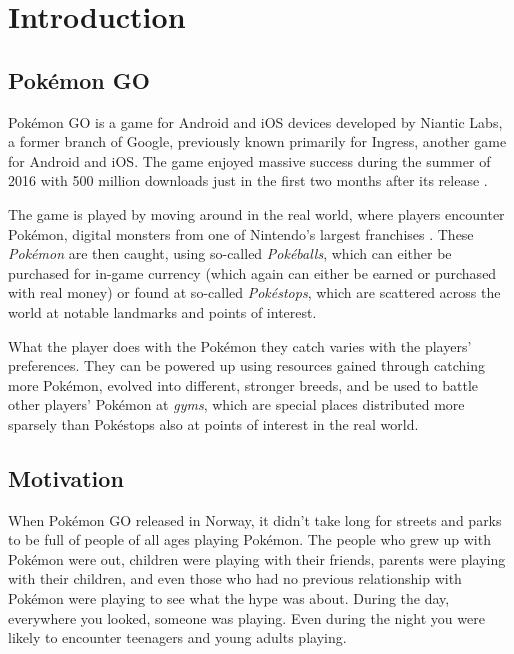
\chapter{Introduction}

\label{Chapter1}

\section{Pokémon GO}
\label{sec:about-pokemon-go}

Pokémon GO is a game for Android and iOS devices developed by Niantic Labs, a former branch of Google, previously known primarily for Ingress, another game for Android and iOS. The game enjoyed massive success during the summer of 2016 with 500 million downloads just in the first two months after its release .

The game is played by moving around in the real world, where players encounter Pokémon, digital monsters from one of Nintendo's largest franchises . These \emph{Pokémon} are then caught, using so-called \emph{Pokéballs}, which can either be purchased for in-game currency (which again can either be earned or purchased with real money) or found at so-called \emph{Pokéstops}, which are scattered across the world at notable landmarks and points of interest.

What the player does with the Pokémon they catch varies with the players' preferences. They can be powered up using resources gained through catching more Pokémon, evolved into different, stronger breeds, and be used to battle other players' Pokémon at \emph{gyms}, which are special places distributed more sparsely than Pokéstops also at points of interest in the real world.

\section{Motivation}

When Pokémon GO released in Norway, it didn't take long for streets and parks to be full of people of all ages playing Pokémon. The people who grew up with Pokémon were out, children were playing with their friends, parents were playing with their children, and even those who had no previous relationship with Pokémon were playing to see what the hype was about. During the day, everywhere you looked, someone was playing. Even during the night you were likely to encounter teenagers and young adults playing.

